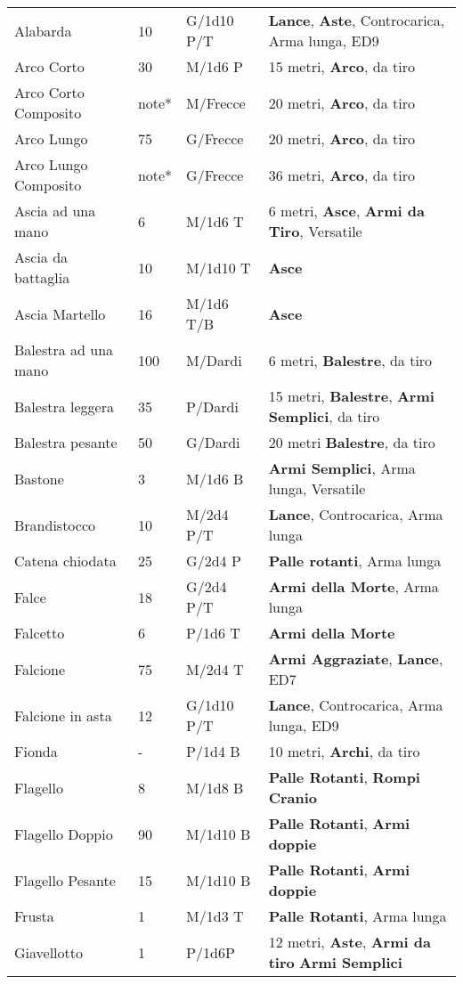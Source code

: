 \documentclass[a4paper,12 pt,openany]{book}
\begin{document}
\begin{textblock*}{19.5cm}
\begin{tabularx}{0.95\textwidth}{llll}
Alabarda& 10 & G/1d10 P/T& \textbf{Lance}, \textbf{Aste}, Controcarica, Arma lunga, ED9\\
Arco Corto& 30 & M/1d6 P& 15 metri, \textbf{Arco}, da tiro\\
Arco Corto Composito& note*& M/Frecce& 20 metri, \textbf{Arco}, da tiro\\
Arco Lungo& 75 & G/Frecce& 20 metri, \textbf{Arco}, da tiro\\
Arco Lungo Composito& note*& G/Frecce& 36 metri, \textbf{Arco}, da tiro\\
Ascia ad una mano& 6  & M/1d6 T& 6 metri, \textbf{Asce}, \textbf{Armi da Tiro}, Versatile\\
Ascia da battaglia& 10 & M/1d10 T&\textbf{Asce}\\
Ascia Martello& 16 & M/1d6 T/B& \textbf{Asce}\\
Balestra ad una mano& 100& M/Dardi& 6 metri, \textbf{Balestre}, da tiro\\
Balestra leggera& 35 & P/Dardi& 15 metri, \textbf{Balestre}, \textbf{Armi Semplici}, da tiro\\
Balestra pesante& 50 & G/Dardi& 20 metri \textbf{Balestre}, da tiro\\
Bastone& 3& M/1d6 B& \textbf{Armi Semplici}, Arma lunga, Versatile\\
Brandistocco& 10 & M/2d4 P/T& \textbf{Lance}, Controcarica, Arma lunga\\
Catena chiodata& 25 & G/2d4 P& \textbf{Palle rotanti}, Arma lunga\\
Falce& 18 & G/2d4 P/T& \textbf{Armi della Morte}, Arma lunga\\
Falcetto& 6& P/1d6 T& \textbf{Armi della Morte} \\
Falcione& 75 & M/2d4 T& \textbf{Armi Aggraziate}, \textbf{Lance}, ED7\\
Falcione in asta& 12 & G/1d10 P/T& \textbf{Lance}, Controcarica, Arma lunga, ED9\\
Fionda& -& P/1d4 B& 10 metri, \textbf{Archi}, da tiro\\
Flagello& 8& M/1d8 B& \textbf{Palle Rotanti}, \textbf{Rompi Cranio}\\
Flagello Doppio& 90 & M/1d10 B& \textbf{Palle Rotanti}, \textbf{Armi doppie}\\
Flagello Pesante& 15 & M/1d10 B& \textbf{Palle Rotanti}, \textbf{Armi doppie}\\
Frusta& 1& M/1d3 T& \textbf{Palle Rotanti}, Arma lunga\\
Giavellotto& 1& P/1d6P& 12 metri, \textbf{Aste}, \textbf{Armi da tiro} \textbf{Armi Semplici}\\

\end{tabularx}
\end{textblock*}
\end{document}
